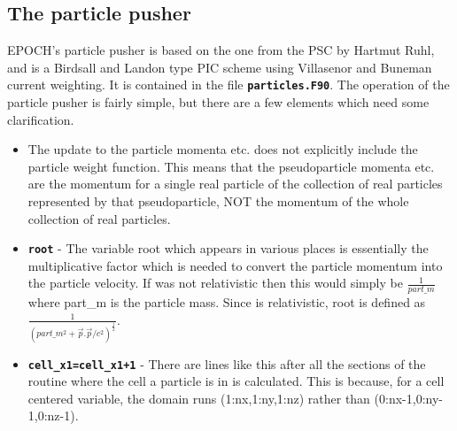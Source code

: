 \documentclass[12pt,a4paper]{article}
\newcommand{\inlinecode}[1]{{\color{warwickred} \bf\texttt{#1}}}
\newcommand{\EPOCH}{{\color{warwickdark}\fontfamily{phv}\selectfont{EPOCH}}}
\begin{document}
\subsection{The particle pusher}
EPOCH's particle pusher is based on the one from the PSC by Hartmut Ruhl, and
is a Birdsall and Landon type PIC scheme using Villasenor and Buneman current
weighting. It is contained in the file \inlinecode{particles.F90}. The
operation of the particle pusher is fairly simple, but there are a few elements
which need some clarification.
\begin{itemize}
\item The update to the particle momenta etc. does not explicitly include the
  particle weight function. This means that the pseudoparticle momenta etc. are
  the momentum for a single real particle of the collection of real particles
  represented by that pseudoparticle, NOT the momentum of the whole collection
  of real particles.
\item \inlinecode{root} - The variable root which appears in various places is
  essentially the multiplicative factor which is needed to convert the particle
  momentum into the particle velocity. If {\EPOCH} was not relativistic then this
  would simply be $\frac{1}{part\_m}$ where part\_m is the particle mass. Since
  {\EPOCH} is relativistic, root is defined as $\frac{1}{(part\_m^2 +
    \vec{p}.\vec{p}/c^2)^\frac{1}{2}}$.
\item \inlinecode{cell\_x1=cell\_x1+1} - There are lines like this after all
  the sections of the routine where the cell a particle is in is
  calculated. This is because, for a cell centered variable, the domain runs
  (1:nx,1:ny,1:nz) rather than (0:nx-1,0:ny-1,0:nz-1).
\end{itemize}
\end{document}
